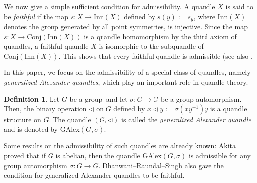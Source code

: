 \documentclass[dvipdfmx,12pt]{amsart}
\theoremstyle{plain}
\theoremstyle{definition}
\newtheorem{dfn}[thm]{Definition}
\newcommand{\qop}{\triangleleft}
\newcommand{\Conj}{\mathrm{Conj}}
\newcommand{\Inn}{\mathrm{Inn}}
\newcommand{\GAlex}{\mathrm{GAlex}}
\begin{document}
We now give a simple sufficient condition for admissibility.
A quandle $X$ is said to be \emph{faithful} if the map $s: X \to \Inn(X)$ defined by $s(y):=s_y$, where $\Inn(X)$ denotes the group generated by all point symmetries, is injective.
Since the map $s: X \to \Conj(\Inn(X))$ is a quandle homomorphism by the third axiom of quandles, 
a faithful quandle $X$ is isomorphic to the subquandle of $\Conj(\Inn(X))$.
This shows that every faithful quandle is admissible (see also \cite[Lemma 2.10]{Grana-2011-NicholsAlgebras}.


In this paper, we focus on the admissibility of a special class of quandles, namely \emph{generalized Alexander quandles}, which play an important role in quandle theory.

\begin{dfn}\label{def:GAlex}
  Let $G$ be a group, and let $\sigma: G \to G$ be a group automorphism.
  Then, the binary operation $\qop$ on $G$ defined by $x \qop y := \sigma(xy^{-1})y$ is a quandle structure on $G$.
  The quandle $(G, \qop)$ is called the \emph{generalized Alexander quandle} and is denoted by $\GAlex(G, \sigma)$.
\end{dfn}

Some results on the admissibility of such quandles are already known:
Akita \cite{Akita-2023-EmbeddingAlexanderQuandlesGroupsa} proved that if $G$ is abelian, then the quandle $\GAlex(G, \sigma)$ is admissible for any group automorphism $\sigma: G \to G$.
Dhanwani--Raundal--Singh 
\cite[Proposition 3.12 (arXiv version)]{Dhanwani-2023-DehnQuandlesGroupsOrientable}
also gave the condition for generalized Alexander quandles to be faithful.

\end{document}
